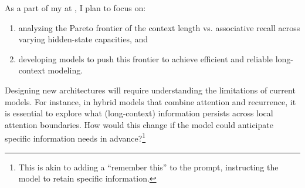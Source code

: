 As a part of my \thedegree at \thecollegeabbr, I plan to focus on:
\begin{enumerate}[itemsep=0pt, topsep=0pt]
    \item analyzing the Pareto frontier of the context length vs. associative recall across varying hidden-state capacities, and
    
    \item developing models to push this frontier to achieve efficient and reliable long-context modeling.
\end{enumerate}
Designing new architectures will require understanding the limitations of current models. For instance, in hybrid models that combine attention and recurrence, it is essential to explore what (long-context) information persists across local attention boundaries. How would this change if the model could anticipate specific information needs in advance?\footnote{This is akin to adding a ``remember this'' to the prompt, instructing the model to retain specific information.}

\par